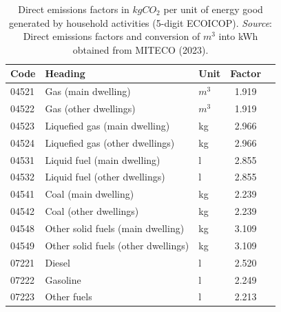 \documentclass[
  10pt,
  twocolumn]{aft}
\begin{document}
\begin{table}[!ht]
\centering\begingroup\fontsize{10}{12}\selectfont
\vspace{-0.25cm}
\begin{tabular}[t]{lllcc}
\toprule
Code & Heading & Unit & Factor\\
\midrule
04521 & Gas (main dwelling) & $m^3$ & 1.919\\
04522 & Gas (other dwellings) & $m^3$ & 1.919\\
04523 & Liquefied gas (main dwelling) & kg & 2.966\\
04524 & Liquefied gas (other dwellings) & kg & 2.966\\
04531 & Liquid fuel (main dwelling) & l & 2.855\\
04532 & Liquid fuel (other dwellings) & l & 2.855\\
04541 & Coal (main dwelling) & kg & 2.239\\
04542 & Coal (other dwellings) & kg & 2.239\\
04548 & Other solid fuels (main dwelling) & kg & 3.109\\
04549 & Other solid fuels (other dwellings) & kg & 3.109\\
07221 & Diesel & l & 2.520\\
07222 & Gasoline & l & 2.249\\
07223 & Other fuels & l & 2.213\\
\bottomrule
\end{tabular}
\endgroup{}
\vspace{-0.25cm}
\caption{Direct emissions factors in $kgCO_2$ per unit of energy good generated by household activities (5-digit ECOICOP). \textit{Source}: Direct emissions factors and conversion of $m^3$ into kWh obtained from MITECO (2023).}
\end{table}
\end{document}
